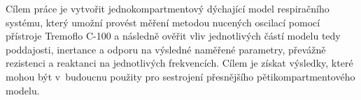 Cílem práce je vytvořit jednokompartmentový dýchající model respiračního systému, který umožní provést měření metodou nucených oscilací pomocí přístroje Tremoflo C-100 a následně ověřit vliv jednotlivých částí modelu tedy poddajosti, inertance a odporu na výsledné naměřené parametry, převážně rezistenci a reaktanci na jednotlivých frekvencích. Cílem je získat výsledky, které mohou být v~budoucnu použity pro sestrojení přesnějšího pětikompartmentového modelu.

